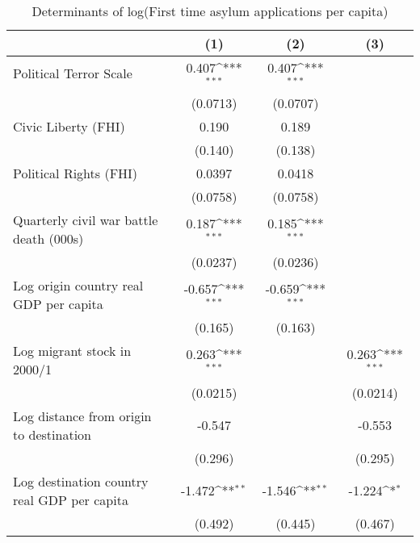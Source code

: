 \begin{table}[htbp]\centering
\def\sym#1{\ifmmode^{#1}\else\(^{#1}\)\fi}
\caption{Determinants of log(First time asylum applications per capita)}
\begin{tabular}{l*{3}{c}}
\hline\hline
                    &\multicolumn{1}{c}{(1)}         &\multicolumn{1}{c}{(2)}         &\multicolumn{1}{c}{(3)}         \\
\hline
Political Terror Scale&       0.407\sym{***}&       0.407\sym{***}&                     \\
                    &    (0.0713)         &    (0.0707)         &                     \\
[1em]
Civic Liberty (FHI) &       0.190         &       0.189         &                     \\
                    &     (0.140)         &     (0.138)         &                     \\
[1em]
Political Rights (FHI)&      0.0397         &      0.0418         &                     \\
                    &    (0.0758)         &    (0.0758)         &                     \\
[1em]
Quarterly civil war battle death (000s)&       0.187\sym{***}&       0.185\sym{***}&                     \\
                    &    (0.0237)         &    (0.0236)         &                     \\
[1em]
Log origin country real GDP per capita&      -0.657\sym{***}&      -0.659\sym{***}&                     \\
                    &     (0.165)         &     (0.163)         &                     \\
[1em]
Log migrant stock in 2000/1&       0.263\sym{***}&                     &       0.263\sym{***}\\
                    &    (0.0215)         &                     &    (0.0214)         \\
[1em]
Log distance from origin to destination&      -0.547         &                     &      -0.553         \\
                    &     (0.296)         &                     &     (0.295)         \\
[1em]
Log destination country real GDP per capita&      -1.472\sym{**} &      -1.546\sym{**} &      -1.224\sym{*}  \\
                    &     (0.492)         &     (0.445)         &     (0.467)         \\

\end{tabular}
\end{table}
